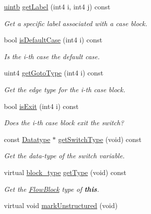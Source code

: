 \begin{DoxyCompactItemize}
\mbox{\hyperlink{types_8h_a2db313c5d32a12b01d26ac9b3bca178f}{uintb}} \mbox{\hyperlink{class_block_switch_a96c22ddffa4cc1b28ad0a1942d9b7524}{get\+Label}} (int4 i, int4 j) const
\begin{DoxyCompactList}\small\item\em Get a specific label associated with a {\itshape case} block. \end{DoxyCompactList}\item 
bool \mbox{\hyperlink{class_block_switch_a952906ee6ff751cb66e365e0e78f165c}{is\+Default\+Case}} (int4 i) const
\begin{DoxyCompactList}\small\item\em Is the i-\/th {\itshape case} the {\itshape default} case. \end{DoxyCompactList}\item 
uint4 \mbox{\hyperlink{class_block_switch_a053ffd21f364e19c3b1b6d7820be36dc}{get\+Goto\+Type}} (int4 i) const
\begin{DoxyCompactList}\small\item\em Get the edge type for the i-\/th {\itshape case} block. \end{DoxyCompactList}\item 
bool \mbox{\hyperlink{class_block_switch_a3e6d878a6e1aeb2ca7278415adfc48db}{is\+Exit}} (int4 i) const
\begin{DoxyCompactList}\small\item\em Does the i-\/th {\itshape case} block exit the switch? \end{DoxyCompactList}\item 
const \mbox{\hyperlink{class_datatype}{Datatype}} $\ast$ \mbox{\hyperlink{class_block_switch_a1f9c2081ef18f91022fd21ff2770fa67}{get\+Switch\+Type}} (void) const
\begin{DoxyCompactList}\small\item\em Get the data-\/type of the switch variable. \end{DoxyCompactList}\item 
virtual \mbox{\hyperlink{class_flow_block_a70df78390870fcdd51e31426ba6a193e}{block\+\_\+type}} \mbox{\hyperlink{class_block_switch_a9796f852aa205ba32346ae9d249f94c1}{get\+Type}} (void) const
\begin{DoxyCompactList}\small\item\em Get the \mbox{\hyperlink{class_flow_block}{Flow\+Block}} type of {\bfseries{this}}. \end{DoxyCompactList}\item 
virtual void \mbox{\hyperlink{class_block_switch_ac0f9b63b617ff225b3240f8dda6cf56b}{mark\+Unstructured}} (void)

\end{DoxyCompactItemize}
